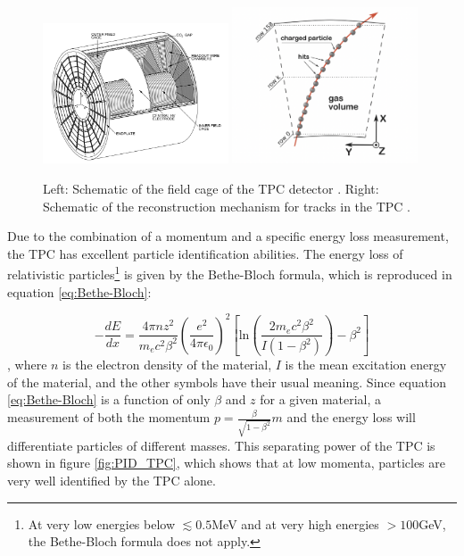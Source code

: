 \begin{figure}
    \centering
    \includegraphics[width=0.49\textwidth]{figures/tpc_cage.png}
    \includegraphics[width=0.49\textwidth]{figures/tpc_process.png}
    \caption{Left: Schematic of the field cage of the TPC detector \cite{TPC_figure}. Right: Schematic of the reconstruction mechanism for tracks in the TPC \cite{ALICE_TPC_trigger}.}
    \label{fig:TPC_schemtic}
\end{figure}

Due to the combination of a momentum and a specific energy loss measurement, the TPC has excellent particle identification abilities. The energy loss of relativistic particles\footnote{At very low energies below $\lesssim 0.5 $MeV and at very high energies $>100$GeV, the Bethe-Bloch formula does not apply. } is given by the Bethe-Bloch formula, which is reproduced in equation \ref{eq:Bethe-Bloch}:

\begin{equation}\label{eq:Bethe-Bloch}
    -\frac{dE}{dx} = \frac{4\pi n z^2}{m_e c^2 \beta^2} \left( \frac{e^2}{4\pi \epsilon_0}\right)^2 \left[ \mathrm{ln}\left(\frac{2m_ec^2\beta^2}{I(1-\beta^2)}\right)-\beta^2 \right]
\end{equation}
, where $n$ is the electron density of the material, $I$ is the mean excitation energy of the material, and the other symbols have their usual meaning. Since equation \ref{eq:Bethe-Bloch} is a function of only $\beta$ and $z$ for a given material, a measurement of both the momentum $p=\frac{\beta}{\sqrt{1-\beta^2}}m$ and the energy loss will differentiate particles of different masses. This separating power of the TPC is shown in figure \ref{fig:PID_TPC}, which shows that at low momenta, particles are very well identified by the TPC alone. \\

